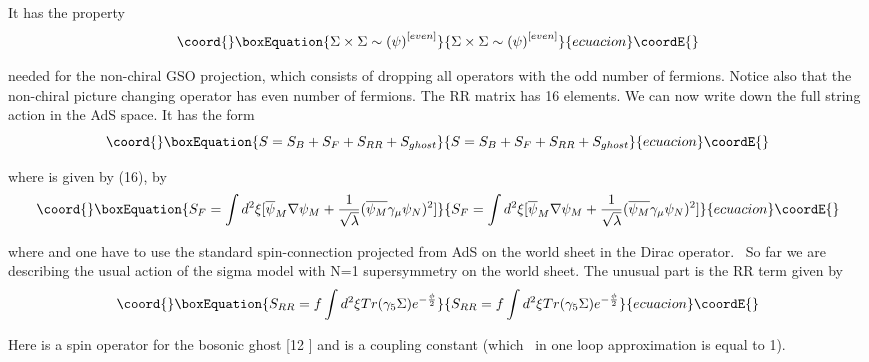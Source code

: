\documentclass[a4paper,12pt]{article}
\begin{document}
It has the property 
\begin{equation}\coord{}\boxEquation{
\Sigma \times \Sigma \sim \left( \psi \right) ^{[even]}
}{
\Sigma \times \Sigma \sim \left( \psi \right) ^{[even]}
}{ecuacion}\coordE{}\end{equation}

needed for the non-chiral GSO projection, which consists of dropping all
operators with the odd number of fermions. Notice also that the non-chiral
picture changing operator has even number of fermions. The RR matrix \myHighlight{$\Sigma 
$}\coordHE{} has 16 elements. We can now write down the full string action in the AdS\coordHE{} space. It has the form 
\begin{equation}\coord{}\boxEquation{
S=S_{B}+S_{F}+S_{RR}+S_{ghost}
}{
S=S_{B}+S_{F}+S_{RR}+S_{ghost}
}{ecuacion}\coordE{}\end{equation}

where \coordHE{} is given by (16), \coordHE{} by 
\begin{equation}\coord{}\boxEquation{
S_{F}=\int d^{2}\xi \lbrack \overline{\psi }_{M}\nabla \psi _{M}+\frac{1}{
\sqrt{\lambda }}(\overline{\psi _{M}}\gamma _{\mu }\psi _{N})^{2}]
}{
S_{F}=\int d^{2}\xi \lbrack \overline{\psi }_{M}\nabla \psi _{M}+\frac{1}{
\sqrt{\lambda }}(\overline{\psi _{M}}\gamma _{\mu }\psi _{N})^{2}]
}{ecuacion}\coordE{}\end{equation}

where \coordHE{}and one have to use the standard spin-connection projected
from AdS on the world sheet in the Dirac operator. \ So far we are
describing the usual action of the sigma model with N=1 supersymmetry on the
world sheet. The unusual part is the RR term given by 
\begin{equation}\coord{}\boxEquation{
S_{RR}=f\int d^{2}\xi Tr(\gamma _{5}\Sigma )e^{-\frac{\phi }{2}}
}{
S_{RR}=f\int d^{2}\xi Tr(\gamma _{5}\Sigma )e^{-\frac{\phi }{2}}
}{ecuacion}\coordE{}\end{equation}

Here \coordHE{} is a spin operator for the bosonic ghost [12 ]
and \coordHE{} is a coupling constant (which \ in one loop approximation is equal
to 1).
\end{document}
